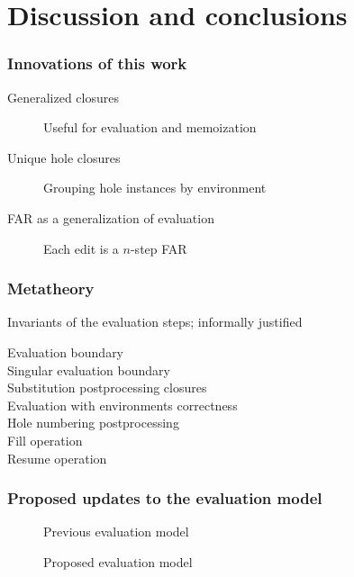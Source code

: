 \documentclass{beamer}
\begin{document}
\section{Discussion and conclusions}

\begin{frame}
  \frametitle{Innovations of this work}

  \begin{description}
  \item[Generalized closures] Useful for evaluation and memoization
  \item[Unique hole closures] Grouping hole instances by environment
  \item[FAR as a generalization of evaluation] Each edit is a $n$-step FAR
  \end{description}
\end{frame}

\begin{frame}
  \frametitle{Metatheory}

  Invariants of the evaluation steps; informally justified

  \begin{description}
  \item[Evaluation boundary]
  \item[Singular evaluation boundary]
  \item[Substitution postprocessing closures]
  \item[Evaluation with environments correctness]
  \item[Hole numbering postprocessing]
  \item[Fill operation]
  \item[Resume operation]
  \end{description}
\end{frame}

\begin{frame}[allowframebreaks]
  \frametitle{Proposed updates to the evaluation model}

  \begin{figure}
    \centering
    \maxsizebox{\textwidth}{15em}{
      
    }
    \caption{Previous evaluation model}
    \label{fig:prev-evaluation-call-graph}
  \end{figure}

  \begin{figure}
    \centering
    \maxsizebox{\textwidth}{15em}{
      
    }
    \caption{Proposed evaluation model}
    \label{fig:current-evaluation-call-graph}
  \end{figure}
\end{frame}
\end{document}
